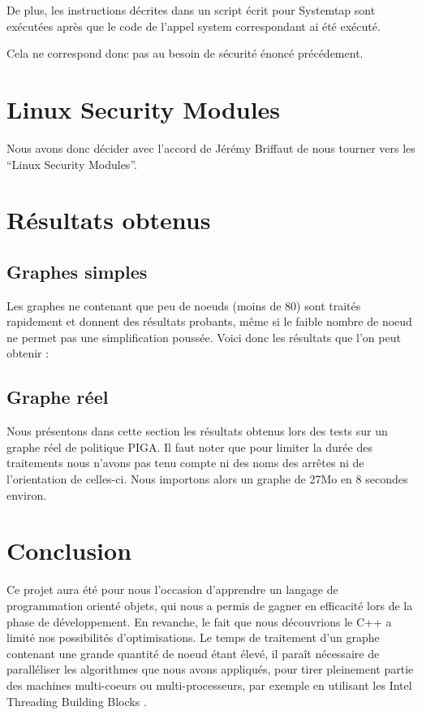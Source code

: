 \documentclass[pdftex,a4paper,titlepage,11pt,openright]{article}
\newcommand{\clearemptydoublepage}{
	\newpage{\pagestyle{empty}\cleardoublepage}}
\begin{document}
De plus, les instructions décrites dans un script écrit pour Systemtap sont exécutées après que le code de l'appel system correspondant ai été exécuté.


Cela ne correspond donc pas au besoin de sécurité énoncé précédement.


\newpage


\section{Linux Security Modules}

Nous avons donc décider avec l'accord de Jérémy Briffaut de nous tourner vers les ``Linux Security Modules''.

\newpage


\section{Résultats obtenus}

\subsection{Graphes simples}
Les graphes ne contenant que peu de noeuds (moins de 80) sont traités rapidement et donnent des résultats probants, même si le faible nombre de noeud ne permet pas une simplification poussée. Voici donc les résultats que l'on peut obtenir :



\subsection{Graphe réel}
Nous présentons dans cette section les résultats obtenus lors des tests sur un graphe réel de politique PIGA. Il faut noter que pour limiter la durée des traitements nous n'avons pas tenu compte ni des noms des arrêtes ni de l'orientation de celles-ci. Nous importons alors un graphe de 27Mo en 8 secondes environ.


\newpage


\clearemptydoublepage

\section*{Conclusion} 

Ce projet aura été pour nous l'occasion d'apprendre un langage de programmation orienté objets, qui nous a permis de gagner en efficacité lors de la phase de développement. En revanche, le fait que nous découvrions le C++ a limité nos possibilités d'optimisations. Le temps de traitement d'un graphe contenant une grande quantité de noeud étant élevé, il paraît nécessaire de paralléliser les algorithmes que nous avons appliqués, pour tirer pleinement partie des machines multi-coeurs ou multi-processeurs, par exemple en utilisant les Intel Threading Building Blocks \cite{TBB}.
\end{document}
